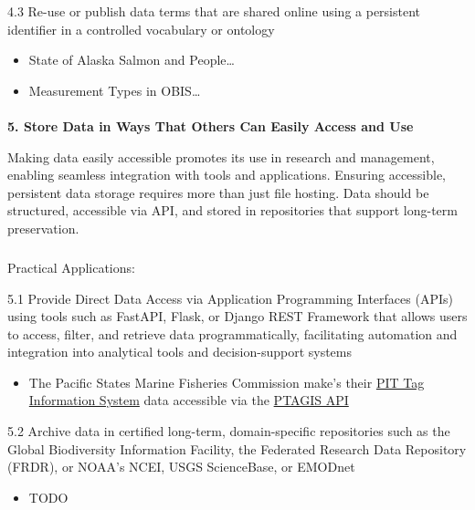 \documentclass[
  letterpaper,
  DIV=11,
  numbers=noendperiod]{scrartcl}
\makeatletter
\let\oldparagraph\paragraph
\renewcommand{\paragraph}{
    \@ifstar
      \xxxParagraphStar
      \xxxParagraphNoStar
  }
\newcommand{\xxxParagraphStar}[1]{\oldparagraph*{#1}\mbox{}}
\newcommand{\xxxParagraphNoStar}[1]{\oldparagraph{#1}\mbox{}}
\let\oldsubparagraph\subparagraph
\renewcommand{\subparagraph}{
    \@ifstar
      \xxxSubParagraphStar
      \xxxSubParagraphNoStar
  }
\newcommand{\xxxSubParagraphStar}[1]{\oldsubparagraph*{#1}\mbox{}}
\newcommand{\xxxSubParagraphNoStar}[1]{\oldsubparagraph{#1}\mbox{}}
\providecommand{\tightlist}{%
  \setlength{\itemsep}{0pt}\setlength{\parskip}{0pt}}\usepackage{longtable,booktabs,array}
\makeatother
\begin{document}
4.3 Re-use or publish data terms that are shared online using a
persistent identifier in a controlled vocabulary or ontology

\begin{itemize}
\item
  State of Alaska Salmon and People\ldots{}
\item
  Measurement Types in OBIS\ldots{}
\end{itemize}

\paragraph{\texorpdfstring{\textbf{5. Store Data in Ways That Others Can
Easily Access and
Use}}{5. Store Data in Ways That Others Can Easily Access and Use}}\label{store-data-in-ways-that-others-can-easily-access-and-use}

Making data easily accessible promotes its use in research and
management, enabling seamless integration with tools and applications.
Ensuring accessible, persistent data storage requires more than just
file hosting. Data should be structured, accessible via API, and stored
in repositories that support long-term preservation.

\subparagraph{Practical Applications:}\label{practical-applications-4}

5.1 Provide Direct Data Access via Application Programming Interfaces
(APIs) using tools such as FastAPI, Flask, or Django REST Framework that
allows users to access, filter, and retrieve data programmatically,
facilitating automation and integration into analytical tools and
decision-support systems

\begin{itemize}
\tightlist
\item
  The Pacific States Marine Fisheries Commission make's their
  \href{https://www.psmfc.org/program/pit-tag-information-systems-ptagis}{PIT
  Tag Information System} data accessible via the
  \href{https://api.ptagis.org/index.html\#:~:text=PTAGIS\%20API\%20Gets\%20a\%20list,PTAGIS\%20and\%20currently\%20contributing\%20data}{PTAGIS
  API}
\end{itemize}

5.2 Archive data in certified long-term, domain-specific repositories
such as the Global Biodiversity Information Facility, the Federated
Research Data Repository (FRDR), or NOAA's NCEI, USGS ScienceBase, or
EMODnet

\begin{itemize}
\tightlist
\item
  TODO
\end{itemize}
\end{document}
